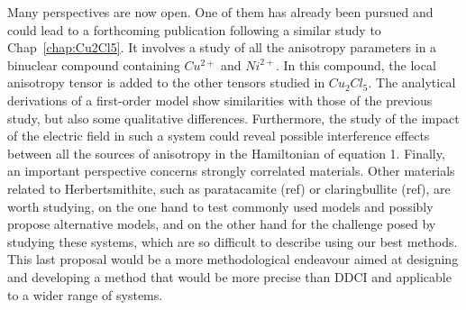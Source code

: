 \documentclass[12pt]{report}
\numberwithin{equation}{section}
\begin{document}
Many perspectives are now open. 
One of them has already been pursued and could lead to a forthcoming publication following a similar study to Chap~\ref{chap:Cu2Cl5}.
It involves a study of all the anisotropy parameters in a binuclear compound containing $Cu^{2+}$ and $Ni^{2+}$.
In this compound, the local anisotropy tensor is added to the other tensors studied in $Cu_2Cl_5$.
The analytical derivations of a first-order model show similarities with those of the previous study, but also some qualitative differences.
Furthermore, the study of the impact of the electric field in such a system could reveal possible interference effects between all the sources of anisotropy in the Hamiltonian of equation 1. 
Finally, an important perspective concerns strongly correlated materials.
Other materials related to Herbertsmithite, such as paratacamite (ref) or claringbullite (ref), are worth studying, on the one hand to test commonly used models and possibly propose alternative models, and on the other hand for the challenge posed by studying these systems, which are so difficult to describe using our best methods.
This last proposal would be a more methodological endeavour aimed at designing and developing a method that would be more precise than DDCI and applicable to a wider range of systems.


\newpage
\printbibliography
\end{document}
